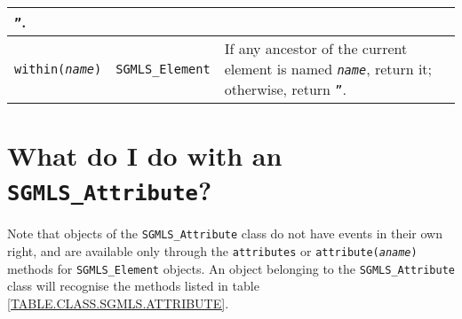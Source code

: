 \begin{table}[htbp]
\begin{tabular}{l|l|l}
{{\tt ''}.\vspace{4pt}}	\\ \hline
\parbox[c]{1.48333333333333in}{\raggedright\vspace{4pt} {\tt within({\tt\sl name\/})}\vspace{4pt}}	 & \parbox[c]{1.48333333333333in}{\raggedright\vspace{4pt} {\tt SGMLS\_Element}\vspace{4pt}}	 & \parbox[c]{1.48333333333333in}{\raggedright\vspace{4pt} If any ancestor of the current element is named
{\tt\sl name\/}, return it; otherwise, return
{\tt ''}.\vspace{4pt}}	\\ \hline
\end{tabular}\end{table}




\section{What do I do with an
{\tt SGMLS\_Attribute}?}
\label{SGMLSATTRIBUTE}


Note that objects of the {\tt SGMLS\_Attribute}
class do not have events in their own right, and are available only
through the {\tt attributes} or
{\tt attribute({\tt\sl aname\/})} methods for
{\tt SGMLS\_Element}
objects.  An object belonging to the
{\tt SGMLS\_Attribute} class will recognise the
methods listed in table \ref{TABLE.CLASS.SGMLS.ATTRIBUTE}.

